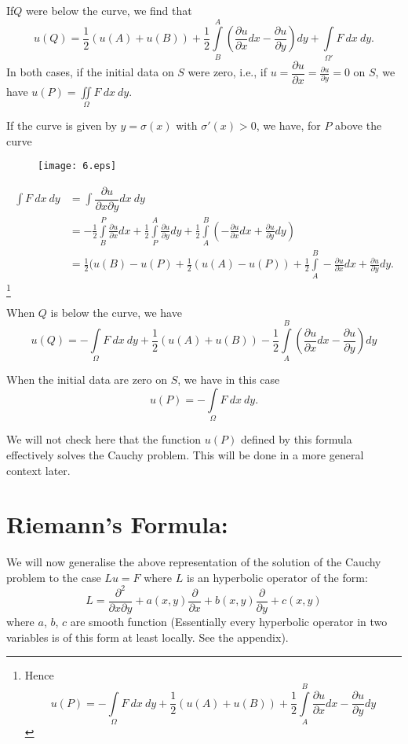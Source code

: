 If\pageoriginale $Q$ were below the curve, we find that
$$
u(Q)=\frac{1}{2}(u(A)+u(B))+\frac{1}{2}\int\limits^{A}_{B}\left(\frac{\partial u}{\partial x}dx-\frac{\partial u}{\partial y}\right)dy+\int\limits_{\Omega'}F \ dx \ dy.
$$
In both cases, if the initial data on $S$ were zero, i.e., if $u=\dfrac{\partial u}{\partial x}=\frac{\partial u}{\partial y}=0$ on $S$, we have $u(P)=\iint\limits_{\Omega}F \ dx \ dy$.

If the curve is given by $y=\sigma(x)$ with $\sigma'(x)>0$, we have, for $P$ above the curve
\begin{figure}[H]
\centering
\texttt{[image: 6.eps]}
\end{figure}
\begin{align*}
\int F \ dx \ dy &= \int \dfrac{\partial u}{\partial x \partial y}dx \ dy\\[3pt]
&= -\frac{1}{2}\int\limits^{P}_{B}\frac{\partial u}{\partial x} dx +\frac{1}{2}\int\limits^{A}_{P}\frac{\partial u}{\partial y}dy + \frac{1}{2}\int\limits^{B}_{A}\left(-\frac{\partial u}{\partial x}dx+\frac{\partial u}{\partial y}dy\right)\\[3pt]
&= \frac{1}{2}(u(B)-u(P)+\frac{1}{2}(u(A)-u(P))+\frac{1}{2}\int\limits^{B}_{A}-\frac{\partial u}{\partial x}dx+\frac{\partial u}{\partial y}dy.
\end{align*}
\footnote[7]{Hence 
$$
u(P)=-\int\limits_{\Omega} F \ dx \ dy +\frac{1}{2}(u(A)+u(B))+\frac{1}{2}\int\limits^{B}_{A}\frac{\partial u}{\partial x}dx-\frac{\partial u}{\partial y}dy
$$}

When $Q$ is below the curve, we have
$$
u(Q)=-\int\limits_{\Omega} F \ dx \ dy +\frac{1}{2}(u(A)+u(B))-\frac{1}{2}\int\limits^{B}_{A}\left(\frac{\partial u}{\partial x}dx-\frac{\partial u}{\partial y}\right)dy
$$

When the initial data are zero on $S$, we have in this case
$$
u(P)=-\int\limits_{\Omega}F \ dx \ dy.
$$

We will not check here that the function $u(P)$ defined by this formula effectively solves the Cauchy problem. This will be done in a more general context later.

\section*{Riemann's Formula:}\pageoriginale

We will now generalise the above representation of the solution of the Cauchy problem to the case $Lu=F$ where $L$ is an hyperbolic operator of the form:
$$
L=\frac{\partial^{2}}{\partial x\partial y}+a(x,y)\frac{\partial}{\partial x}+b(x,y)\frac{\partial}{\partial y}+c(x,y)
$$
where $a$, $b$, $c$ are smooth function (Essentially every hyperbolic operator in two variables is of this form at least locally. See the appendix).

